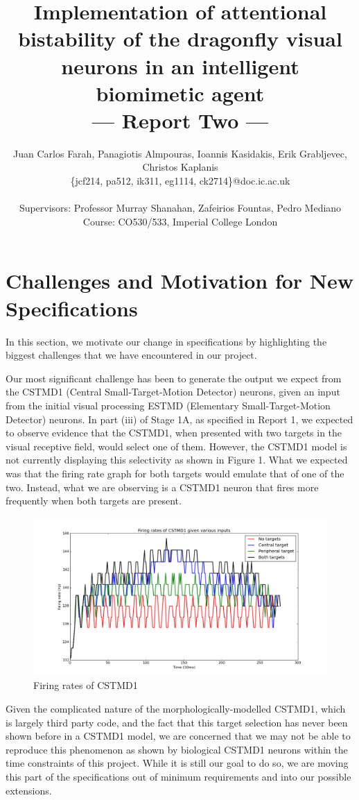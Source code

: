\documentclass[a4paper,11pt]{article}
\title{Implementation of attentional bistability of the dragonfly visual neurons in an intelligent biomimetic agent\\\Large{--- Report Two ---}}
\author{Juan Carlos Farah, Panagiotis Almpouras, Ioannis Kasidakis, Erik Grabljevec, Christos Kaplanis\\
       \{jcf214, pa512, ik311, eg1114, ck2714\}@doc.ic.ac.uk\\ \\
       \small{Supervisors: Professor Murray Shanahan, Zafeirios Fountas, Pedro Mediano}\\
       \small{Course: CO530/533, Imperial College London}
}
\begin{document}
\maketitle
\section{Challenges and Motivation for New Specifications}
In this section, we motivate our change in specifications by highlighting the biggest challenges that we have encountered in our project. 

Our most significant challenge has been to generate the output we expect from the CSTMD1 (Central Small-Target-Motion Detector) neurons, given an input from the initial visual processing ESTMD (Elementary Small-Target-Motion Detector) neurons. In part (iii) of Stage 1A, as specified in Report 1, we expected to observe evidence that the CSTMD1, when presented with two targets in the visual receptive field, would select one of them. However, the CSTMD1 model is not currently displaying this selectivity as shown in Figure 1. What we expected was that the firing rate graph for both targets would emulate that of one of the two. Instead, what we are observing is a CSTMD1 neuron that fires more frequently when both targets are present.

	\begin{figure}[h]
	\begin{center}
	\includegraphics[scale = 0.3]{firingrates}
	\end{center}
	\caption{Firing rates of CSTMD1}
	\end{figure}	

Given the complicated nature of the morphologically-modelled CSTMD1, which is largely third party code, and the fact that this target selection has never been shown before in a CSTMD1 model, we are concerned that we may not be able to reproduce this phenomenon as shown by biological CSTMD1 neurons within the time constraints of this project. While it is still our goal to do so, we are moving this part of the specifications out of minimum requirements and into our possible extensions.
\end{document}
